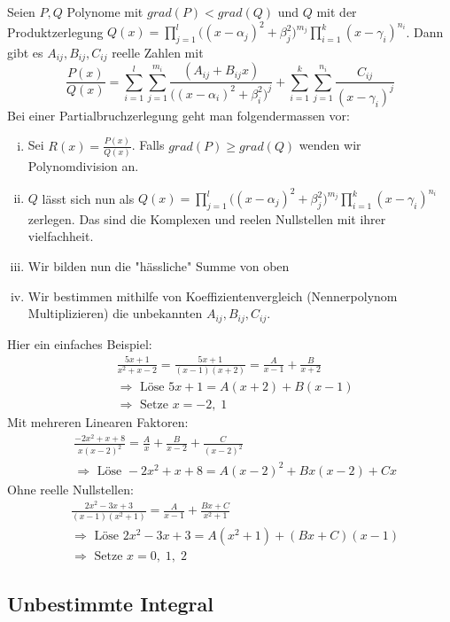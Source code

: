 \documentclass[8pt]{article}
\begin{document}
\begin{multicols*}{3}
Seien $P, Q$ Polynome mit $grad(P) < grad(Q)$ und $Q$ mit der Produktzerlegung $Q(x) = \prod_{j = 1}^l \big( (x- \alpha_j)^2 + \beta_j^2\big)^{m_j} \prod_{i = 1}^k (x - \gamma_i)^{n_i}$. Dann gibt es $A_{ij}, B_{ij}, C_{ij}$ reelle Zahlen mit
$$
  \frac{P(x)}{Q(x)} = \sum_{i = 1}^l \sum_{j = 1}^{m_i} \frac{(A_{ij} + B_{ij}x)}{\big( (x- \alpha_i)^2 + \beta_i^2\big)^j} + \sum_{i = 1}^k \sum_{j = 1}^{n_i} \frac{C_{ij}}{(x-\gamma_i)^j}
$$
Bei einer Partialbruchzerlegung geht man folgendermassen vor:
\begin{enumerate}[(i)]
  \item Sei $R(x) = \frac{P(x)}{Q(x)}$. Falls $grad(P) \geq grad(Q)$ wenden wir Polynomdivision an.
  \item $Q$ lässt sich nun als $Q(x) = \prod_{j = 1}^l \big( (x- \alpha_j)^2 + \beta_j^2\big)^{m_j} \prod_{i = 1}^k (x - \gamma_i)^{n_i}$ zerlegen. Das sind
  die Komplexen und reelen Nullstellen mit ihrer vielfachheit.
  \item Wir bilden nun die "hässliche" Summe von oben
  \item Wir bestimmen mithilfe von Koeffizientenvergleich (Nennerpolynom Multiplizieren) die unbekannten $A_{ij}, B_{ij}, C_{ij}$.
\end{enumerate}
Hier ein einfaches Beispiel:
\begin{align*}
  &\frac{5x + 1}{x^2 + x - 2} = \frac{5x + 1}{(x - 1)(x + 2)} = \frac{A}{x - 1} + \frac{B}{x + 2} \\
  &\Rightarrow \text{ Löse } 5x + 1 = A(x + 2) + B(x - 1) \\
  &\Rightarrow \text{ Setze } x = -2,\;1
\end{align*}
Mit mehreren Linearen Faktoren:
\begin{align*}
  &\frac{-2x^2 + x + 8}{x (x-2)^2} = \frac{A}{x} + \frac{B}{x - 2} + \frac{C}{(x-2)^2} \\
  &\Rightarrow \text{ Löse } -2x^2 + x + 8 = A(x - 2)^2 + Bx(x - 2) + Cx
\end{align*}
Ohne reelle Nullstellen:
\begin{align*}
  &\frac{2x^2 -3x + 3}{(x-1)(x^2 + 1)} = \frac{A}{x - 1} + \frac{Bx + C}{x^2 + 1} \\
  &\Rightarrow \text{ Löse } 2x^2 -3x + 3 = A(x^2 + 1) + (Bx + C)(x - 1) \\
  &\Rightarrow \text{ Setze } x = 0,\;1,\;2
\end{align*}

\subsection{Unbestimmte Integral}


\end{multicols*}
\end{document}
